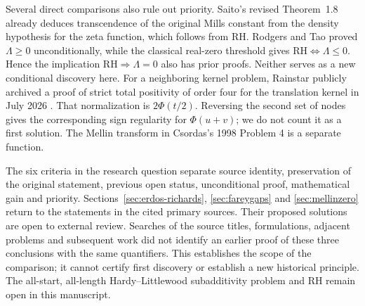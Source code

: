 \documentclass[11pt,a4paper]{article}
\begin{document}
Several direct comparisons also rule out priority. Saito's revised
Theorem~1.8 \cite{saito} already deduces transcendence of the original
Mills constant from the density hypothesis for the zeta function,
which follows from RH. Rodgers and Tao \cite{rt} proved
$\Lambda\ge0$ unconditionally, while the classical real-zero threshold
gives $\mathrm{RH}\Leftrightarrow\Lambda\le0$. Hence the implication
$\mathrm{RH}\Rightarrow\Lambda=0$ also has prior proofs. Neither
serves as a new conditional discovery here.
For a neighboring kernel problem, Rainstar publicly archived a proof
of strict total positivity of order four for the translation kernel
in July 2026 \cite{pf4}. That normalization is $2\Phi(t/2)$.
Reversing the second set of nodes gives the corresponding sign
regularity for $\Phi(u+v)$; we do not count it as a first solution.
The Mellin transform in Csordas's 1998 Problem 4 is a separate function.

The six criteria in the research question separate source identity,
preservation of the original statement, previous open status, unconditional
proof, mathematical gain and priority. Sections~\ref{sec:erdos-richards},
\ref{sec:fareygaps} and \ref{sec:mellinzero} return to the statements
in the cited primary sources. Their proposed solutions are open to
external review. Searches of the source titles, formulations, adjacent
problems and subsequent work did not identify an earlier proof of these
three conclusions with the same quantifiers. This establishes the
scope of the comparison; it cannot certify first discovery or
establish a new historical principle. The all-start, all-length
Hardy--Littlewood subadditivity problem and RH remain open in this
manuscript.
\end{document}
